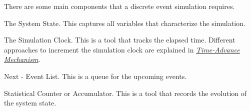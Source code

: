 There are some main components that a discrete event simulation requires.

The System State. This captures all variables that characterize the simulation.

The Simulation Clock. This is a tool that tracks the elapsed time. Different approaches to increment the simulation clock are explained in \hyperref[des:timeadvance]{\textit{Time-Advance Mechanism}}.

Next - Event List. This is a queue for the upcoming events.

Statistical Counter or Accumulator. This is a tool that records the evolution of the system state.
%
%
%
%

%
%


